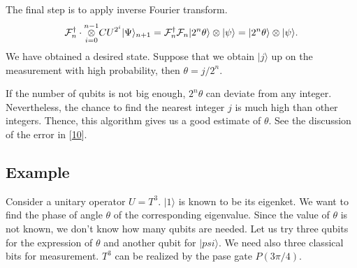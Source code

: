 \documentclass[letterpaper,10pt,english]{jupyterBook}
\begin{document}
\sphinxAtStartPar
The final step is to apply inverse Fourier transform.
\begin{equation*}
\begin{split}
\mathcal{F}^\dagger_{n} \cdot \overset{n-1}{\underset{i=0}{\Large\otimes}} CU^{2^i} |\Psi\rangle_{n+1} = \mathcal{F}^\dagger _{n} \mathcal{F}_{n} |2^n \theta\rangle \otimes |\psi\rangle =  |2^n \theta\rangle \otimes |\psi\rangle.
\end{split}
\end{equation*}
\sphinxAtStartPar
We have obtained a desired state.  Suppose that we obtain \(|j\rangle\) up on the measurement with high probability, then \(\theta = j/2^n\).

\sphinxAtStartPar
If the number of qubits is not big enough, \(2^n \theta\) can deviate from any integer.  Nevertheless, the chance to find the nearest integer \(j\) is much high than other integers.  Thence, this algorithm gives us a good estimate of \(\theta\).  See the discussion of the error in {[}\hyperlink{cite.references:id5}{10}{]}.


\subsection{Example}
\label{\detokenize{algorithms/qpe:example}}
\sphinxAtStartPar
Consider a unitary operator \(U = T^3\). \(|1\rangle\) is known to be its eigenket.  We want to find the phase of angle \(\theta\) of the corresponding eigenvalue.  Since the value of \(\theta\) is not known, we don’t know how many qubits are needed.  Let us try three qubits for the expression of \(\theta\) and another qubit for \(|psi\rangle\).  We need also three classical bits for measurement. \(T^3\) can be realized by the pase gate \(P(3\pi/4)\).
\end{document}
